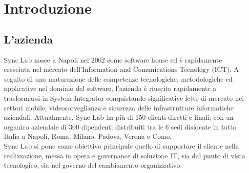 
\chapter{Introduzione}
\label{cap:introduzione}





\section{L'azienda}

Sync Lab nasce a Napoli nel 2002 come software house ed è rapidamente cresciuta nel mercato dell’Information and Comunications Tecnology (ICT). A seguito di una maturazione delle competenze tecnologiche, metodologiche ed applicative nel dominio del software, l’azienda è riuscita rapidamente a trasformarsi in System Integrator conquistando significative fette di mercato nei settori mobile, videosorveglianza e sicurezza delle infrastrutture informatiche aziendali. Attualmente, Sync Lab ha più di 150 clienti diretti e finali, con un organico aziendale di 300 dipendenti distribuiti tra le 6 sedi dislocate in tutta Italia a Napoli, Roma, Milano, Padova, Verona e Como.\\
Sync Lab si pone come obiettivo principale quello di supportare il cliente nella realizzazione, messa in opera e governance di soluzione IT, sia dal punto di vista tecnologico, sia nel governo del cambiamento organizzativo.

